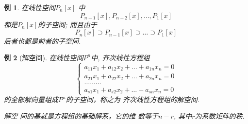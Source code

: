\documentclass[13pt]{beamer}
\newtheorem{exa}{例}
\begin{document}
\begin{frame}
\begin{exa}
	在线性空间$P_{n}[x]$ 中 $${P}_{n-1}[x], {P}_{n-2}[x], \ldots, {P}_{1}[x]$$
都是$P_n[x]$的子空间; 而且由于 $${P}_{n}[x] \supset {P}_{n-1}[x] \supset \ldots \supset {P}_{1}[x]$$
后者也都是前者的子空间.
\end{exa}
\end{frame}

\begin{frame}
\begin{exa}[解空间] 
在线性空间$P^n$中, 齐次线性方程组 
$$
\left\{\begin{array}{l}
a_{11} x_{1}+a_{12} x_{2}+\dots+a_{1 n} x_{n}=0 \\
a_{21} x_{1}+a_{22} x_{2}+\dots+a_{2 n} x_{n}=0 \\
\dots \dots \dots \\ 
a_{s 1} x_{1}+a_{s 2} x_{2}+\dots+a_{s n} x_{n}=0
\end{array}\right.
$$
的全部解向量组成$P^n$的子空间，称之为 齐次线性方程组的解空间.

解空 间的基就是方程组的基础解系，它的维 数等于$n-r$, 其中$r$为系数矩阵的秩.
\end{exa}
\end{frame}
\end{document}
